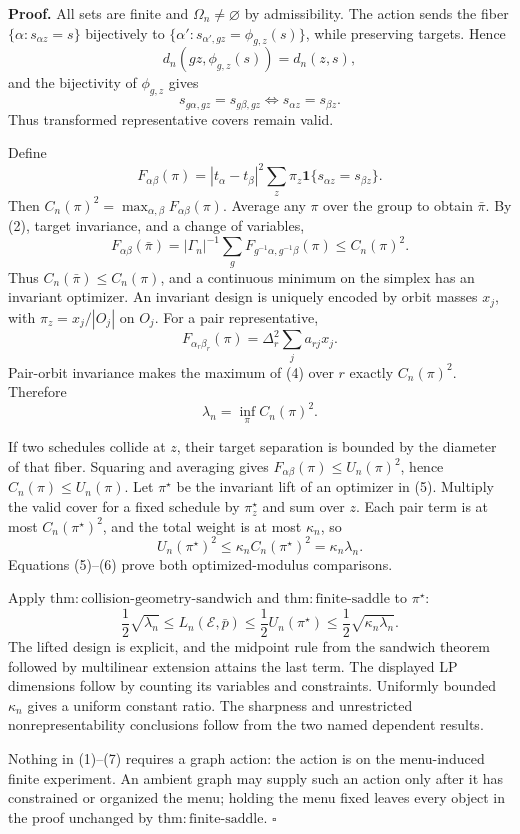 \textbf{Proof.}
All sets are finite and \(\Omega_n\ne\varnothing\) by admissibility. The action sends the fiber \(\{\alpha:s_{\alpha z}=s\}\) bijectively to \(\{\alpha':s_{\alpha',gz}=\phi_{g,z}(s)\}\), while preserving targets. Hence
\[
 d_n(gz,\phi_{g,z}(s))=d_n(z,s), \tag{1}
\]
and the bijectivity of \(\phi_{g,z}\) gives
\[
 s_{g\alpha,gz}=s_{g\beta,gz}
 \Longleftrightarrow s_{\alpha z}=s_{\beta z}. \tag{2}
\]
Thus transformed representative covers remain valid.

Define
\[
 F_{\alpha\beta}(\pi)=|t_\alpha-t_\beta|^2
 \sum_z\pi_z\mathbf1\{s_{\alpha z}=s_{\beta z}\}.
\]
Then \(C_n(\pi)^2=\max_{\alpha,\beta}F_{\alpha\beta}(\pi)\). Average any \(\pi\) over the group to obtain \(\bar\pi\). By (2), target invariance, and a change of variables,
\[
 F_{\alpha\beta}(\bar\pi)
 =|\Gamma_n|^{-1}\sum_gF_{g^{-1}\alpha,g^{-1}\beta}(\pi)
 \le C_n(\pi)^2. \tag{3}
\]
Thus \(C_n(\bar\pi)\le C_n(\pi)\), and a continuous minimum on the simplex has an invariant optimizer. An invariant design is uniquely encoded by orbit masses \(x_j\), with \(\pi_z=x_j/|O_j|\) on \(O_j\). For a pair representative,
\[
 F_{\alpha_r\beta_r}(\pi)=\Delta_r^2\sum_ja_{rj}x_j. \tag{4}
\]
Pair-orbit invariance makes the maximum of (4) over \(r\) exactly \(C_n(\pi)^2\). Therefore
\[
 \lambda_n=\inf_\pi C_n(\pi)^2. \tag{5}
\]

If two schedules collide at \(z\), their target separation is bounded by the diameter of that fiber. Squaring and averaging gives \(F_{\alpha\beta}(\pi)\le U_n(\pi)^2\), hence \(C_n(\pi)\le U_n(\pi)\). Let \(\pi^\star\) be the invariant lift of an optimizer in (5). Multiply the valid cover for a fixed schedule by \(\pi_z^\star\) and sum over \(z\). Each pair term is at most \(C_n(\pi^\star)^2\), and the total weight is at most \(\kappa_n\), so
\[
 U_n(\pi^\star)^2\le\kappa_n C_n(\pi^\star)^2
 =\kappa_n\lambda_n. \tag{6}
\]
Equations (5)--(6) prove both optimized-modulus comparisons.

Apply \(\mathrm{thm{:}collision\text{-}geometry\text{-}sandwich}\) and \(\mathrm{thm{:}finite\text{-}saddle}\) to \(\pi^\star\):
\[
 \frac12\sqrt{\lambda_n}
 \le L_n(\mathcal E,\bar p)
 \le\frac12U_n(\pi^\star)
 \le\frac12\sqrt{\kappa_n\lambda_n}. \tag{7}
\]
The lifted design is explicit, and the midpoint rule from the sandwich theorem followed by multilinear extension attains the last term. The displayed LP dimensions follow by counting its variables and constraints. Uniformly bounded \(\kappa_n\) gives a uniform constant ratio. The sharpness and unrestricted nonrepresentability conclusions follow from the two named dependent results.

Nothing in (1)--(7) requires a graph action: the action is on the menu-induced finite experiment. An ambient graph may supply such an action only after it has constrained or organized the menu; holding the menu fixed leaves every object in the proof unchanged by \(\mathrm{thm{:}finite\text{-}saddle}\). \(\square\)